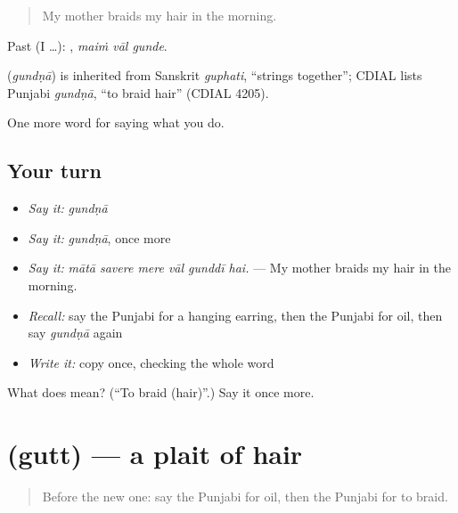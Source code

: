 \begin{quote}
My mother braids my hair in the morning.
\end{quote}

Past (I …):   , \emph{maiṁ vāl gunde}.

\begin{cousinweb}
\textbf{} (\emph{gundṇā}) is inherited from Sanskrit \emph{guphati}, \textquotedblleft{}strings together\textquotedblright{}; CDIAL lists Punjabi \emph{gundṇā}, \textquotedblleft{}to braid hair\textquotedblright{} (CDIAL 4205).
\end{cousinweb}

\begin{grammarlens}[title={What you've built}]
One more word for saying what you do.
\end{grammarlens}

\subsection*{Your turn}
\begin{itemize}
\raggedright
  \item \emph{Say it:} \emph{gundṇā}
  \item \emph{Say it:} \emph{gundṇā}, once more
  \item \emph{Say it:} \emph{mātā savere mere vāl gunddī hai.} — My mother braids my hair in the morning.
  \item \emph{Recall:} say the Punjabi for a hanging earring, then the Punjabi for oil, then say \emph{gundṇā} again
  \item \emph{Write it:} copy \textbf{} once, checking the whole word
\end{itemize}

\begin{tcolorbox}[breakable,colback=teal!4,colframe=teal!35!black,title={Before you move on}]
What does  mean? (\textquotedblleft{}To braid (hair)\textquotedblright{}.) Say it once more.
\end{tcolorbox}
\section[\texorpdfstring{\pa{ਗੁੱਤ} (gutt)}{ਗੁੱਤ (gutt)}]{ (gutt) — a plait of hair}

\label{lesson:PA-C231-gutt}



\begin{quote}
Before the new one: say the Punjabi for oil, then the Punjabi for to braid.
\end{quote}

